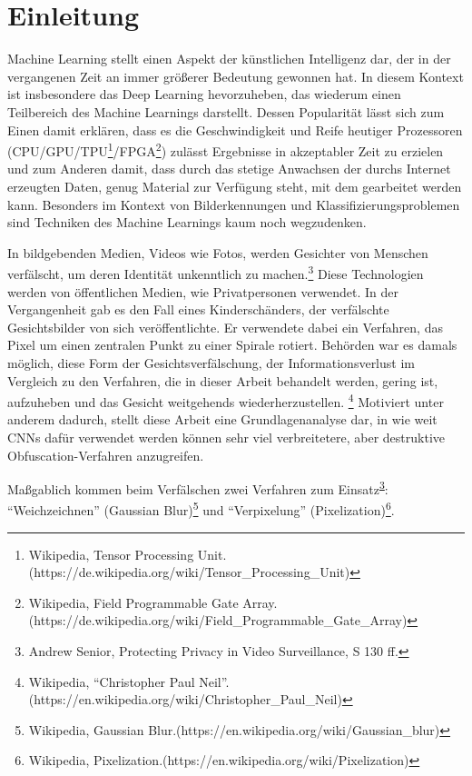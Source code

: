 \section{Einleitung}

Machine Learning stellt einen Aspekt der künstlichen Intelligenz dar, der in der vergangenen Zeit an immer größerer
Bedeutung gewonnen hat. In diesem Kontext ist insbesondere das Deep Learning hevorzuheben, das wiederum einen Teilbereich
des Machine Learnings darstellt. Dessen Popularität lässt sich zum Einen damit erklären, dass es die Geschwindigkeit und
Reife heutiger Prozessoren (CPU/GPU/TPU\footnote{Wikipedia, Tensor Processing Unit.\newline
(https://de.wikipedia.org/wiki/Tensor\_Processing\_Unit)}/FPGA\footnote{Wikipedia, Field Programmable Gate Array.\newline
(https://de.wikipedia.org/wiki/Field\_Programmable\_Gate\_Array)})
zulässt Ergebnisse in akzeptabler Zeit zu erzielen und zum Anderen damit, dass durch das stetige Anwachsen der durchs Internet
erzeugten Daten, genug Material zur Verfügung steht, mit dem gearbeitet werden kann. Besonders im Kontext von Bilderkennungen
und Klassifizierungsproblemen sind Techniken des Machine Learnings kaum noch wegzudenken.

In bildgebenden Medien, Videos wie Fotos, werden Gesichter von Menschen verfälscht, um deren Identität unkenntlich
zu machen.\footnote{Andrew Senior, Protecting Privacy in Video Surveillance, S 130 ff.\label{fn:protecting_privacy}}
Diese Technologien werden von
öffentlichen Medien, wie Privatpersonen verwendet. In der Vergangenheit
gab es den Fall eines Kinderschänders, der verfälschte Gesichtsbilder von sich veröffentlichte. Er verwendete dabei
ein Verfahren, das Pixel um einen zentralen Punkt zu einer Spirale rotiert. Behörden war es damals möglich, diese
Form der Gesichtsverfälschung, der Informationsverlust im Vergleich zu den Verfahren, die in dieser Arbeit behandelt
werden, gering ist, aufzuheben und das Gesicht weitgehends wiederherzustellen.
\footnote{Wikipedia, ``Christopher Paul Neil''.\newline(https://en.wikipedia.org/wiki/Christopher\_Paul\_Neil)}
Motiviert unter anderem dadurch,
stellt diese Arbeit eine Grundlagenanalyse dar, in wie weit CNNs dafür verwendet werden können sehr viel verbreitetere,
aber destruktive Obfuscation-Verfahren anzugreifen.

Maßgablich kommen beim Verfälschen zwei Verfahren zum Einsatz\textsuperscript{\ref{fn:protecting_privacy}}:
``Weichzeichnen'' (Gaussian Blur)\footnote{Wikipedia, Gaussian Blur.\newline(https://en.wikipedia.org/wiki/Gaussian\_blur)}
 und ``Verpixelung'' (Pixelization)\footnote{Wikipedia, Pixelization.\newline(https://en.wikipedia.org/wiki/Pixelization)\label{label:pixelization}}.



